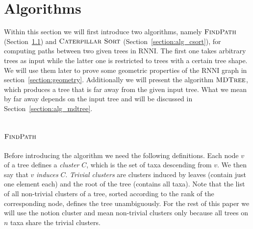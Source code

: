 \documentclass{amsart}
\newcommand{\rnni}{\mathrm{RNNI}}
\newcommand{\csort}{\textsc{Caterpillar Sort}}
\newcommand{\findpath}{\textsc{FindPath}}
\newcommand{\mdtree}{\textsc{MDTree}}
\begin{document}


\section{Algorithms}
\label{section:algorithms}

Within this section we will first introduce two algorithms, namely $\findpath$ (Section~\ref{section:alg_findpath}) and $\csort$ (Section~\ref{section:alg_csort}), for computing paths between two given trees in $\rnni$.
The first one takes arbitrary trees as input while the latter one is restricted to trees with a certain tree shape.
We will use them later to prove some geometric properties of the $\rnni$ graph in section~\ref{section:geometry}.
Additionally we will present the algorithm $\mdtree$, which produces a tree that is far away from the given input tree.
What we mean by far away depends on the input tree and will be discussed in Section~\ref{section:alg_mdtree}.


\subsection{$\findpath$}
\label{section:alg_findpath}

Before introducing the algorithm we need the following definitions.
Each node $v$ of a tree defines a \emph{cluster} $C$, which is the set of taxa descending from $v$.
We then say that $v$ \emph{induces} $C$.
\emph{Trivial clusters} are clusters induced by leaves (contain just one element each) and the root of the tree (contains all taxa).
Note that the list of all non-trivial clusters of a tree, sorted according to the rank of the corresponding node, defines the tree unambiguously.
For the rest of this paper we will use the notion cluster and mean non-trivial clusters only because all trees on $n$ taxa share the trivial clusters.
\end{document}
